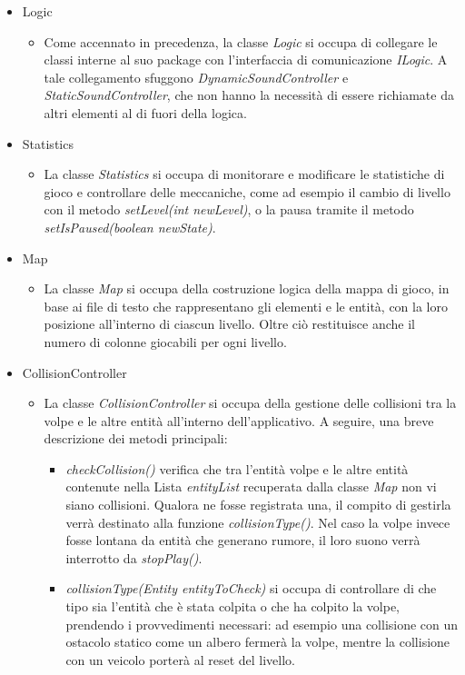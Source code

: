 \documentclass[12pt,a4paper]{report}
\begin{document}
\begin{itemize}
	\item Logic 
	\begin{itemize}
		\item Come accennato in precedenza, la classe \emph{Logic} si occupa di collegare le classi interne al suo package con l'interfaccia di comunicazione \emph{ILogic}. A tale collegamento sfuggono \emph{DynamicSoundController} e \emph{StaticSoundController}, che non hanno la necessità di essere richiamate da altri elementi al di fuori della logica.
	\end{itemize}
	\item Statistics
	\begin{itemize}
		\item La classe \emph{Statistics} si occupa di monitorare e modificare le statistiche di gioco e controllare delle meccaniche, come ad esempio il cambio di livello con il metodo \emph{setLevel(int newLevel)}, o la pausa tramite il metodo \emph{setIsPaused(boolean newState)}. 
	\end{itemize}
	\item Map 
	\begin{itemize}
		\item La classe \emph{Map} si occupa della costruzione logica della mappa di gioco, in base ai file di testo che rappresentano gli elementi e le entità, con la loro posizione all'interno di ciascun livello. Oltre ciò restituisce anche il numero di colonne giocabili per ogni livello.
	\end{itemize}
	\item CollisionController
	\begin{itemize}
		\item La classe \emph{CollisionController} si occupa della gestione delle collisioni tra la volpe e le altre entità all'interno dell'applicativo. A seguire, una breve descrizione dei metodi principali:
		\begin{itemize}	
			\item \emph{checkCollision()} verifica che tra l'entità volpe e le altre entità contenute nella Lista \emph{entityList} recuperata dalla classe \emph{Map} non vi siano collisioni. Qualora ne fosse registrata una, il compito di gestirla verrà destinato alla funzione \emph{collisionType()}. Nel caso la volpe invece fosse lontana da entità che generano rumore, il loro suono verrà interrotto da \emph{stopPlay()}.
			\item \emph{collisionType(Entity entityToCheck)} si occupa di controllare di che tipo sia l'entità che è stata colpita o che ha colpito la volpe, prendendo i provvedimenti necessari: ad esempio una collisione con un ostacolo statico come un albero fermerà la volpe, mentre la collisione con un veicolo porterà al reset del livello.

\end{itemize}
\end{itemize}
\end{itemize}
\end{document}
